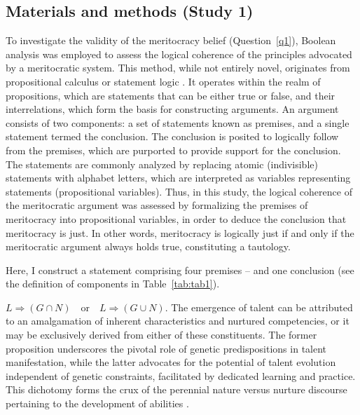 \subsection{Materials and methods (Study 1)}

To investigate the validity of the meritocracy belief (Question~\ref{q1}), Boolean analysis was employed to assess the logical coherence of the principles advocated by a meritocratic system. This method, while not entirely novel, originates from propositional calculus or statement logic \citep{buning1999propositional}. It operates within the realm of propositions, which are statements that can be either true or false, and their interrelations, which form the basis for constructing arguments. An argument consists of two components: a set of statements known as premises, and a single statement termed the conclusion. The conclusion is posited to logically follow from the premises, which are purported to provide support for the conclusion. The statements are commonly analyzed by replacing atomic (indivisible) statements with alphabet letters, which are interpreted as variables representing statements (propositional variables). Thus, in this study, the logical coherence of the meritocratic argument was assessed by formalizing the premises of meritocracy into propositional variables, in order to deduce the conclusion that meritocracy is just. In other words, meritocracy is logically just if and only if the meritocratic argument always holds true, constituting a tautology.

Here, I construct a statement comprising four premises -- and one conclusion  
(see the definition of components in Table~\ref{tab:tab1}).

\begin{premise*}[H1]\label{H1}
	$
	L \Rightarrow (G \cap N) \quad \text{or} \quad L \Rightarrow (G \cup N).
	$
	The emergence of talent can be attributed to an amalgamation of inherent characteristics and nurtured competencies, or it may be exclusively derived from either of these constituents. The former proposition underscores the pivotal role of genetic predispositions in talent manifestation, while the latter advocates for the potential of talent evolution independent of genetic constraints, facilitated by dedicated learning and practice. This dichotomy forms the crux of the perennial nature versus nurture discourse pertaining to the development of abilities \citep{meyer2022talents}.
\end{premise*}

